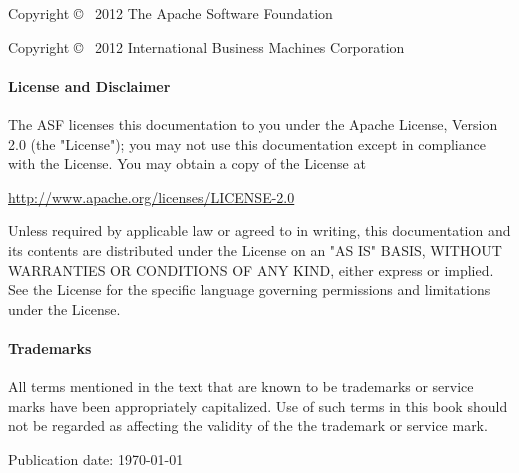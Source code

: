
%
%
Copyright \copyright~ 2012 The Apache Software Foundation

Copyright \copyright~ 2012 International Business Machines Corporation

{\addtolength{\leftskip}{10 mm}
     \paragraph{License and Disclaimer}
     The ASF licenses this documentation to you under the Apache License, Version 2.0 (the "License");
     you may not use this documentation except in compliance with the License.  You may obtain a copy of
     the License at
              
     \url{http://www.apache.org/licenses/LICENSE-2.0}
     
     Unless required by applicable law or agreed to in writing, this documentation and its contents are
     distributed under the License on an "AS IS" BASIS, WITHOUT WARRANTIES OR CONDITIONS OF ANY KIND,
     either express or implied.  See the License for the specific language governing permissions and
     limitations under the License.

     \paragraph{Trademarks}     
     All terms mentioned in the text that are known to be trademarks or service marks have been
     appropriately capitalized.  Use of such terms in this book should not be regarded as affecting the
     validity of the the trademark or service mark.

}

\vspace{.5in}

Publication date: \mydate\today
